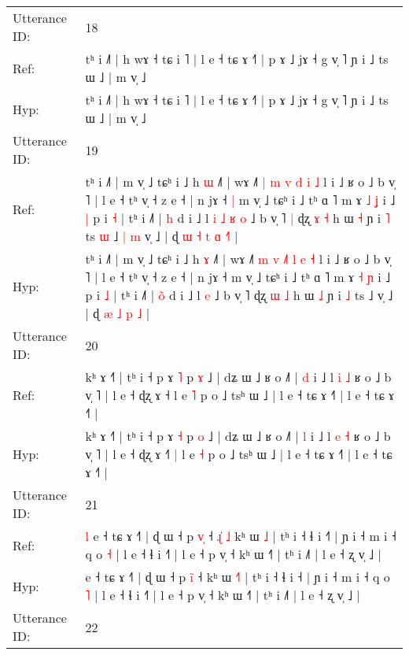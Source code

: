 \documentclass[10pt]{article}
\DeclareRobustCommand{\hl}[1]{{\textcolor{red}{#1}}}
\begin{document}
\begin{longtable}{ll}
 \\
\midrule
Utterance ID: & 18 \\
Ref: & tʰ i ˩˥ | h wɤ ˧ tɕ i ˥ | l e ˧ tɕ ɤ ˧˥ | p ɤ ˩ jɤ ˧ g v̩ ˥ ɲ i ˩ ts ɯ ˩ | m v̩ ˩
 \\
Hyp: & tʰ i ˩˥ | h wɤ ˧ tɕ i ˥ | l e ˧ tɕ ɤ ˧˥ | p ɤ ˩ jɤ ˧ g v̩ ˥ ɲ i ˩ ts ɯ ˩ | m v̩ ˩
 \\
\midrule
Utterance ID: & 19 \\
Ref: & tʰ i ˩˥ | m v̩ ˩ tɕʰ i ˩ h \hl{ɯ} ˩˥ | wɤ ˩˥ \hl{|} \hl{m} \hl{}\hl{v} \hl{d} \hl{i} \hl{˩} l i ˩ ʁ o ˩ b v̩ ˥ | l e ˧ tʰ v̩ ˧ z e ˧ | n jɤ ˧\hl{ }\hl{|} m v̩ ˩ tɕʰ i ˩ tʰ ɑ ˥ m ɤ \hl{˩} \hl{ʝ} i ˩\hl{ }\hl{|} p i \hl{˧} | tʰ i ˩˥ | \hl{}\hl{h} d i ˩ l\hl{ }\hl{i}\hl{ }\hl{˩}\hl{ }\hl{ʁ} \hl{o} ˩ b v̩ ˥\hl{ }\hl{|} ɖʐ \hl{ɤ} \hl{˧} h ɯ \hl{˧} ɲ i \hl{˥} ts\hl{ }\hl{ɯ} ˩\hl{ }\hl{|}\hl{ }\hl{m} v̩ ˩ | ɖ\hl{ }\hl{ɯ} \hl{˧} \hl{t} \hl{ɑ} \hl{˧}\hl{˥} |
 \\
Hyp: & tʰ i ˩˥ | m v̩ ˩ tɕʰ i ˩ h \hl{ɤ} ˩˥ | wɤ ˩˥ \hl{m} \hl{v} \hl{˩}\hl{˥} \hl{l} \hl{e} \hl{˧} l i ˩ ʁ o ˩ b v̩ ˥ | l e ˧ tʰ v̩ ˧ z e ˧ | n jɤ ˧\hl{}\hl{} m v̩ ˩ tɕʰ i ˩ tʰ ɑ ˥ m ɤ \hl{˧} \hl{ɲ} i ˩\hl{}\hl{} p i \hl{˩} | tʰ i ˩˥ | \hl{o}\hl{̃} d i ˩ l\hl{}\hl{}\hl{}\hl{}\hl{}\hl{} \hl{e} ˩ b v̩ ˥\hl{}\hl{} ɖʐ \hl{ɯ} \hl{˩} h ɯ \hl{˩} ɲ i \hl{˩} ts\hl{}\hl{} ˩\hl{}\hl{}\hl{}\hl{} v̩ ˩ | ɖ\hl{}\hl{} \hl{æ} \hl{˩} \hl{p} \hl{}\hl{˩} |
 \\
\midrule
Utterance ID: & 20 \\
Ref: & kʰ ɤ ˧˥ | tʰ i ˧ p ɤ \hl{˥} p \hl{ɤ} ˩ | dʑ ɯ ˩ ʁ o ˩˥ | \hl{d} i ˩ l \hl{i} \hl{˩} ʁ o ˩ b v̩ ˥ | l e ˧ ɖʐ ɤ ˧\hl{}\hl{}\hl{} l e \hl{˥} p o ˩ tsʰ ɯ ˩ | l e ˧ tɕ ɤ ˧˥ | l e ˧ tɕ ɤ ˧˥ |
 \\
Hyp: & kʰ ɤ ˧˥ | tʰ i ˧ p ɤ \hl{˧} p \hl{o} ˩ | dʑ ɯ ˩ ʁ o ˩˥ | \hl{l} i ˩ l \hl{e} \hl{˧} ʁ o ˩ b v̩ ˥ | l e ˧ ɖʐ ɤ ˧\hl{˥}\hl{ }\hl{|} l e \hl{˧} p o ˩ tsʰ ɯ ˩ | l e ˧ tɕ ɤ ˧˥ | l e ˧ tɕ ɤ ˧˥ |
 \\
\midrule
Utterance ID: & 21 \\
Ref: & \hl{l}\hl{ }e ˧ tɕ ɤ ˧˥ | ɖ ɯ ˧ p \hl{v}\hl{̩} ˧\hl{ }\hl{ɻ}\hl{̍}\hl{ }\hl{˩} kʰ ɯ \hl{}\hl{˩} | tʰ i ˧ ɬ i ˧\hl{˥} | ɲ i ˧ m i ˧ q o \hl{˧} | l e ˧ ɬ i ˧˥ | l e ˧ p v̩ ˧ kʰ ɯ ˧˥ | tʰ i ˩˥ | l e ˧ ʐ v̩ ˩ |
 \\
Hyp: & \hl{}\hl{}e ˧ tɕ ɤ ˧˥ | ɖ ɯ ˧ p \hl{i}\hl{̃} ˧\hl{}\hl{}\hl{}\hl{}\hl{} kʰ ɯ \hl{˧}\hl{˥} | tʰ i ˧ ɬ i ˧\hl{} | ɲ i ˧ m i ˧ q o \hl{˥} | l e ˧ ɬ i ˧˥ | l e ˧ p v̩ ˧ kʰ ɯ ˧˥ | tʰ i ˩˥ | l e ˧ ʐ v̩ ˩ |
 \\
\midrule
Utterance ID: & 22 \\

\end{longtable}
\end{document}
